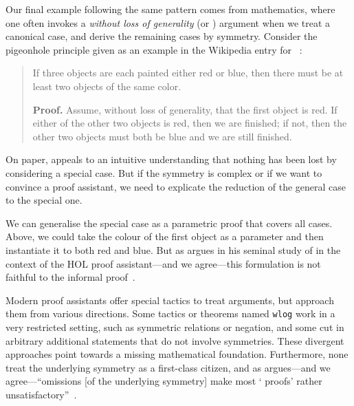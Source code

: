 Our final example following the same pattern comes from mathematics,
where one often invokes a \emph{without loss of generality} (or \WLOG)
argument when we treat a canonical case, and derive the remaining
cases by symmetry. Consider the pigeonhole principle given as an
example in the Wikipedia entry for \WLOG{}~\cite{wiki:wlog}:
%
\begin{quote}
If three objects are each painted either red or blue, then there must
be at least two objects of the same color.

\textbf{Proof.} Assume, without loss of generality, that the first
object is red. If either of the other two objects is red, then we are
finished; if not, then the other two objects must both be blue and we
are still finished.
\end{quote}
%
On paper, \WLOG appeals to an intuitive understanding that nothing has
been lost by considering a special case. But if the symmetry is complex
or if we want to convince a proof assistant, we need
to explicate the reduction of the general case
to the special one.

We can generalise the special case as a parametric proof that covers
all cases. Above, we could take the colour of the first object as a
parameter and then instantiate it to both red and blue. But as
\citeauthor{DBLP:conf/tphol/Harrison09} argues in his seminal study of
\WLOG in the context of the HOL proof assistant---and we agree---this
formulation is not faithful to the informal
proof~\cite{DBLP:conf/tphol/Harrison09}.

Modern proof assistants offer special tactics to treat \WLOG
arguments, but approach them from various directions. Some tactics or
theorems named \texttt{wlog} work in a very restricted setting, such
as symmetric relations or negation, and some cut in arbitrary
additional statements that do not involve symmetries.
These divergent approaches point towards a missing
mathematical foundation. Furthermore, none treat the
underlying symmetry as a first-class citizen, and as
\citeauthor{dijkstra:wlog} argues---and we agree---``omissions [of the
underlying symmetry] make most `\WLOG{} proofs' rather
unsatisfactory''~\cite{dijkstra:wlog}.

